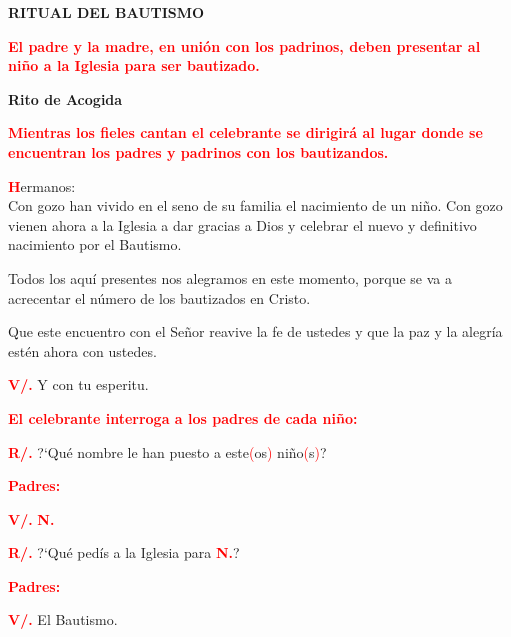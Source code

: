 \documentclass[12pt, letterpaper]{report}
\begin{document}
\begin{center}
\Huge {\bfseries RITUAL DEL BAUTISMO}
\end{center}

\large {\bfseries \textcolor{red}{El padre y la madre, en uni\'on con los padrinos, deben presentar al ni\~no a la Iglesia para ser bautizado.}}

\begin{center}
\Huge {\bfseries Rito de Acogida}
\end{center}

\large {\bfseries \textcolor{red}{Mientras los fieles cantan el celebrante se dirigir\'a al lugar donde se encuentran los padres y padrinos con los bautizandos.}}

\lettrine[lines=1]{\bfseries \textcolor{red}{H}}{}\Large {ermanos:}\\
\Large{Con gozo han vivido en el seno de su familia el nacimiento de un ni\~no. Con gozo vienen ahora a la Iglesia a dar gracias a Dios y celebrar el nuevo y definitivo nacimiento por el Bautismo.}

\Large {Todos los aqu\'i presentes nos alegramos en este momento, porque se va a acrecentar el n\'umero de los bautizados en Cristo.}

\Large {Que este encuentro con el Se\~nor reavive la fe de ustedes y que la paz y la alegr\'ia est\'en ahora con ustedes.}

\Large{{\bfseries \textcolor{red}{V/.}} \hspace{1cm} Y con tu esperitu.}

\large {\bfseries \textcolor{red}{El celebrante interroga a los padres de cada ni\~no:}}

\Large {\bfseries \textcolor{red}{R/.}} \hspace{1cm} ?`Qu\'e nombre le han puesto a este\textcolor{red}{(}os\textcolor{red}{)} ni\~no\textcolor{red}{(}s\textcolor{red}{)}?

\large {\bfseries \textcolor{red}{Padres:}}

{\bfseries \textcolor{red}{V/.}} \hspace{1cm} \Large {\bfseries \textcolor{red}{N.}}

\Large {{\bfseries \textcolor{red}{R/.}} \hspace{1cm} ?`Qu\'e ped\'is a la Iglesia para \bfseries \textcolor{red}{N.}}?

\large {\bfseries \textcolor{red}{Padres:}}

{\bfseries \textcolor{red}{V/.}} \hspace{1cm} El Bautismo.
\end{document}
